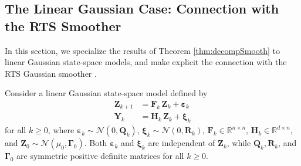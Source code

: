 \documentclass[twoside,11pt]{article}
\newcommand{\Gauss}{\mathcal{N}}                                      %
\newcommand{\re}{\mathbb{R}}
\newcommand{\Yb}{\boldsymbol{Y}}
\newcommand{\Zb}{\boldsymbol{Z}}
\newcommand{\Fb}{\boldsymbol{F}}
\newcommand{\Hb}{\boldsymbol{H}}
\newcommand{\Qb}{\boldsymbol{Q}}
\newcommand{\Rb}{\boldsymbol{R}}
\newcommand{\Gammab}{\boldsymbol{\Gamma}}
\newcommand{\forop}{ \Fb }
\newcommand{\noised}{ \boldsymbol{\varepsilon} }
\newcommand{\noisedcov}{ \Qb }
\newcommand{\noiseo}{ \boldsymbol{\xi} }
\newcommand{\noiseocov}{ \Rb }
\newcommand{\obsop}{ \Hb }
\begin{document}
%
%
%
%
%
%
%
%
%
%
%
%
%
%
%
%
%
%





\subsection{The Linear Gaussian Case: Connection with the 
RTS Smoother}
\label{sec:smoothLinGauss}
%
%
%
%
%
%
%
In this section, we specialize the results of Theorem \ref{thm:decompSmooth}
to linear Gaussian state-space models, and make explicit the
connection with the RTS Gaussian smoother \citep{rauch1965maximum}.
%
%
%

Consider a linear Gaussian state-space model defined by 
\begin{align}
 \Zb_{k+1}  &=  \forop_{k} \, \Zb_k + \noised_{k} \\
 \Yb_k      &= \obsop_k \, \Zb_k + \noiseo_k \nonumber  
\end{align}
for all $k \ge 0$, where $\noised_{k}\sim \Gauss( 0 , \noisedcov_k )$,
$\noiseo_{k}\sim \Gauss( 0 , \noiseocov_k )$,
$\forop_{k} \in \re^{n \times n}$, $\obsop_k \in \re^{ d \times n }$, and
$\Zb_0 \sim \Gauss( \mu_0, \Gammab_0 )$.
Both $\noised_{k}$ and $\noiseo_{k}$ are independent of $\Zb_k$, while
$\noisedcov_k, \noiseocov_k$, and $\Gammab_0$ are symmetric positive definite %
matrices for all $k\ge 0$.
\end{document}

